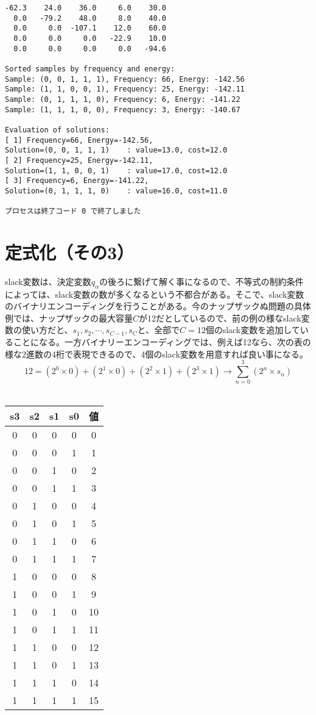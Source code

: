 \documentclass[uplatex,dvipdfmx,a4paper,11pt,oneside,openany]{jsbook}
\begin{document}
\begin{verbatim}
-62.3    24.0    36.0     6.0    30.0
  0.0   -79.2    48.0     8.0    40.0
  0.0     0.0  -107.1    12.0    60.0
  0.0     0.0     0.0   -22.9    10.0
  0.0     0.0     0.0     0.0   -94.6

Sorted samples by frequency and energy:
Sample: (0, 0, 1, 1, 1), Frequency: 66, Energy: -142.56
Sample: (1, 1, 0, 0, 1), Frequency: 25, Energy: -142.11
Sample: (0, 1, 1, 1, 0), Frequency: 6, Energy: -141.22
Sample: (1, 1, 1, 0, 0), Frequency: 3, Energy: -140.67

Evaluation of solutions:
[ 1] Frequency=66, Energy=-142.56,
Solution=(0, 0, 1, 1, 1)	: value=13.0, cost=12.0
[ 2] Frequency=25, Energy=-142.11,
Solution=(1, 1, 0, 0, 1)	: value=17.0, cost=12.0
[ 3] Frequency=6, Energy=-141.22,
Solution=(0, 1, 1, 1, 0)	: value=16.0, cost=11.0

プロセスは終了コード 0 で終了しました
\end{verbatim}

\section{定式化（その3）}

slack変数は、決定変数$q_\alpha$の後ろに繋げて解く事になるので、不等式の制約条件によっては、slack変数の数が多くなるという不都合がある。そこで、slack変数のバイナリエンコーディングを行うことがある。今のナップザックぬ問題の具体例では、ナップザックの最大容量$C$が12だとしているので、前の例の様なslack変数の使い方だと、$s_1, s_2,\cdots,s_{C-1}, s_C$と、全部で$C=12$個のslack変数を追加していることになる。一方バイナリーエンコーディングでは、例えば12なら、次の表の様な2進数の4桁で表現できるので、4個のslack変数を用意すれば良い事になる。\\
\[
12 = (2^0 \times 0) + (2^1 \times 0) + (2^2 \times 1) + (2^3 \times 1) \rightarrow \sum_{n=0}^3 (2^n \times s_n)
\]\\

\begin{tabular}{|c|c|c|c|c|}\hline
  s3&s2&s1&s0&値\\\hline
  0&0&0&0& 0\\
  0&0&0&1& 1\\
  0&0&1&0& 2\\
  0&0&1&1& 3\\
  0&1&0&0& 4\\
  0&1&0&1& 5\\
  0&1&1&0& 6\\
  0&1&1&1& 7\\
  1&0&0&0& 8\\
  1&0&0&1& 9\\
  1&0&1&0& 10\\
  1&0&1&1& 11\\
  1&1&0&0& 12\\\hline
  1&1&0&1& 13\\
  1&1&1&0& 14\\
  1&1&1&1& 15\\\hline
\end{tabular}\\
\end{document}
